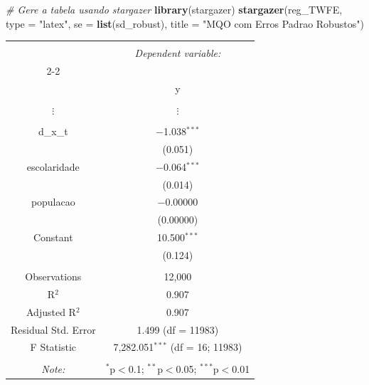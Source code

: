 \documentclass[portugues]{article}
\newenvironment{Shaded}{\begin{snugshade}}{\end{snugshade}}
\newcommand{\AttributeTok}[1]{\textcolor[rgb]{0.13,0.29,0.53}{#1}}
\newcommand{\CommentTok}[1]{\textcolor[rgb]{0.56,0.35,0.01}{\textit{#1}}}
\newcommand{\FunctionTok}[1]{\textcolor[rgb]{0.13,0.29,0.53}{\textbf{#1}}}
\newcommand{\NormalTok}[1]{#1}
\newcommand{\StringTok}[1]{\textcolor[rgb]{0.31,0.60,0.02}{#1}}
\begin{document}
\begin{boxA}
\begin{Shaded}
\begin{Highlighting}[]
\CommentTok{\# Gere a tabela usando stargazer}
\FunctionTok{library}\NormalTok{(stargazer)}
\FunctionTok{stargazer}\NormalTok{(reg\_TWFE, }\AttributeTok{type =} \StringTok{"latex"}\NormalTok{, }\AttributeTok{se =} \FunctionTok{list}\NormalTok{(sd\_robust),}
\AttributeTok{title =} \StringTok{"MQO com Erros Padrao Robustos"}\NormalTok{)}
\end{Highlighting}
\end{Shaded}


    \begingroup
        \fontsize{8pt}{12pt}\selectfont
        \begin{center}
         \begin{tabular}{@{\extracolsep{5pt}}cc} 
         \\[-1.8ex]\hline 
         \hline \\[-1.8ex] 
          & \multicolumn{1}{c}{\textit{Dependent variable:}} \\ 
         \cline{2-2} 
         \\[-1.8ex] & y \\ 
         \hline \\[-1.8ex] 
            $\vdots$ & $\vdots$ \\
            & \\
        d\_x\_t & $-$1.038$^{***}$ \\ 
           & (0.051) \\
          escolaridade & $-$0.064$^{***}$ \\ 
           & (0.014) \\ 
          populacao & $-$0.00000 \\ 
           & (0.00000) \\ 
          Constant & 10.500$^{***}$ \\ 
           & (0.124) \\ 
         \hline \\[-1.8ex] 
         Observations & 12,000 \\ 
         R$^{2}$ & 0.907 \\ 
         Adjusted R$^{2}$ & 0.907 \\ 
         Residual Std. Error & 1.499 (df = 11983) \\ 
         F Statistic & 7,282.051$^{***}$ (df = 16; 11983) \\ 
         \hline 
         \hline \\[-1.8ex] 
         \textit{Note:}  & \multicolumn{1}{r}{$^{*}$p$<$0.1; $^{**}$p$<$0.05; $^{***}$p$<$0.01} \\ 
        

\end{tabular}
\end{center}
\end{boxA}
\end{document}
